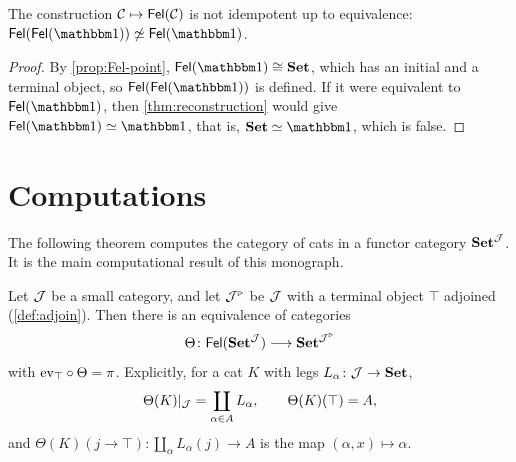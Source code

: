 \begin{corollary}\label{cor:not-idempotent}
The construction $\mathcal{C}\mapsto\mathsf{Fel}(\mathcal{C})$ is not idempotent up to equivalence:
$\Fel(\Fel(\one))\not\eqv\Fel(\one)$.
\end{corollary}

\begin{proof}
By \cref{prop:Fel-point}, $\Fel(\one)\iso\Set$, which has an initial and a
terminal object, so $\Fel(\Fel(\one))$ is defined. If it were equivalent to
$\Fel(\one)$, then \cref{thm:reconstruction} would give $\Fel(\one)\eqv\one$,
that is, $\Set\eqv\one$, which is false.
\end{proof}

\section{Computations}\label{sec:computations}

The following theorem computes the category of cats in a functor category
$\mathbf{Set}^{\mathcal{J}}$. It is the main computational result of this monograph.

\begin{theorem}\label{thm:Fel-Set-J}
Let $\mathcal{J}$ be a small category, and let $\mathcal{J}^{\triangleright}$ be $\mathcal{J}$ with a
terminal object $\top$ adjoined (\cref{def:adjoin}). Then there is an
equivalence of categories
\[
\Theta\colon\mathsf{Fel}(\mathbf{Set}^{\mathcal{J}})\longrightarrow\mathbf{Set}^{\mathcal{J}^{\triangleright}}
\]
with $\mathrm{ev}_\top\circ\Theta=\pi$. Explicitly, for a cat $K$ with legs
$L_\alpha\colon\mathcal{J}\to\mathbf{Set}$,
\[
\Theta(K)|_{\mathcal{J}}=\coprod_{\alpha\in A}L_\alpha,\qquad
\Theta(K)(\top)=A,
\]
and $\Theta(K)(j\to\top)\colon\coprod_\alpha L_\alpha(j)\to A$ is the map $(\alpha,x)\mapsto\alpha$.
\end{theorem}

